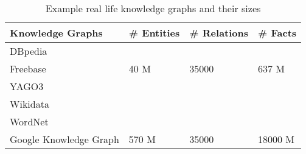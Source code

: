 \begin{table}[t]
\centering

\label{tab:kgs}
\begin{tabular}{@{}llll@{}}
\toprule
Knowledge Graphs       & \# Entities & \# Relations & \# Facts \\ \midrule
DBpedia                &             &              &          \\
Freebase               &     40 M    &      35000   &    637 M \\
YAGO3                  &             &              &          \\
Wikidata               &             &              &          \\
WordNet                &             &              &          \\
Google Knowledge Graph &      570 M  &       35000  &   18000 M\\ \bottomrule
\end{tabular}
\caption{Example real life knowledge graphs and their sizes}

\end{table}